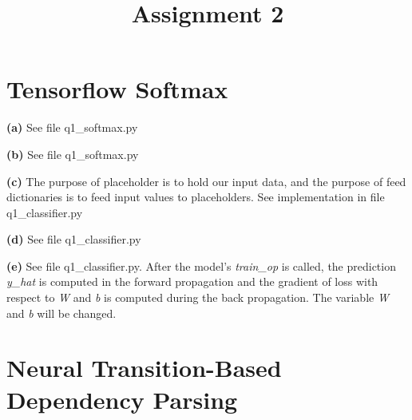 \documentclass[10pt, a4paper]{ctexart}
\begin{document}
\title{Assignment 2}
\date{}
\author{}
\maketitle

\section{Tensorflow Softmax}
{\bf{(a)}} See file q1\_softmax.py\par
{\bf{(b)}} See file q1\_softmax.py\par
{\bf{(c)}} The purpose of placeholder is to hold our input data, and the purpose of feed dictionaries is to feed input values to placeholders. See implementation in file q1\_classifier.py\par
{\bf{(d)}} See file q1\_classifier.py\par
{\bf({e})} See file q1\_classifier.py. After the model's {\emph{train\_op}} is called, the prediction {\emph{y\_hat}} is computed in the forward propagation and the gradient of loss with respect to {\emph{W}} and {\emph{b}} is computed during the back propagation. The variable {\emph{W}} and {\emph{b}} will be changed.\par

\section{Neural Transition-Based Dependency Parsing}
\end{document}
